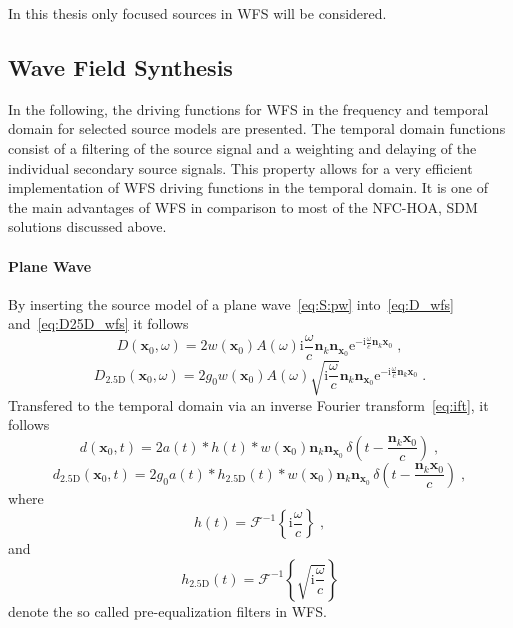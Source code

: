 \documentclass[a4paper]{book}
\newcommand{\reproduce}[1]{%
    \href{#1}{\color{link}\large\Pointinghand}%
}%
\newcommand{\ft}{\footnotesize}                                   %
\newcommand{\I}{\mathrm{i}}                          %
\newcommand{\E}{\mathrm{e}}                          %
\renewcommand{\vec}[1]{\mathbf{#1}}                  %
\newcommand{\x}{\vec{x}}                             %
\newcommand{\xref}{\x_\text{ref}}                    %
\newcommand{\n}{\vec{n}}                             %
\newcommand{\omegac}{\frac{\omega}{c}}               %
\newcommand{\deltafunc}[1]{\,\delta\!\left(#1\right)}%
\newcommand{\IFT}[1]{%
    \mathcal{F}^{-1}\left\{#1\right\}}%
\newcommand{\qc}{\;,}                                             %
\newcommand{\qp}{\;.}                                             %
\def \twohalfD {{2.5\text{D}}\xspace}                             %
\newcommand\eqlabel[2][]{%
  \label{eq:#2}%
}
\begin{document}
In this thesis only focused sources in WFS will be considered.


\subsection{Wave Field Synthesis}
\label{sec:driving_functions_wfs}

In the following, the driving functions for WFS in the frequency and
temporal domain
for selected source models are presented. The temporal domain
functions consist of a filtering of the source signal and a weighting and
delaying of the individual secondary source signals. This property allows for a very efficient
implementation of WFS driving functions in the temporal domain.
It is one of the main advantages of WFS in comparison
to most of the NFC-HOA, SDM solutions discussed above.

\paragraph{Plane Wave}
%
By inserting the source model of a plane wave~\eqref{eq:S:pw}
into~\eqref{eq:D_wfs} and~\eqref{eq:D25D_wfs} it follows
%
\begin{equation}
    D(\x_0,\omega) = 2 w(\x_0) A(\omega) \I\omegac \n_k\n_{\x_0}
    \E^{-\I\omegac\n_k\x_0} \qc
    \eqlabel{D:wfs:pw}
\end{equation}
%
\begin{equation}
    D_\twohalfD(\x_0,\omega) = 2g_0 w(\x_0) A(\omega) \sqrt{\I\omegac} \n_k\n_{\x_0} 
    \E^{-\I\omegac\n_k\x_0} \qp
    \eqlabel{D:wfs:pw:2.5D}
\end{equation}
%
%    
%
Transfered to the temporal domain via an inverse Fourier
transform~\eqref{eq:ift}, it follows
%
\begin{equation}
    d(\x_0,t) = 2 a(t) * h(t) * w(\x_0) \n_k \n_{\x_0} \deltafunc{t -
    \frac{\n_k\x_0}{c}} \qc
    \eqlabel{d:wfs:pw}
\end{equation}
%
\begin{equation}
    d_\twohalfD(\x_0,t) = 2g_0 a(t) * h_\twohalfD(t) * w(\x_0) \n_k \n_{\x_0}
    \deltafunc{t - \frac{\n_k\x_0}{c}} \qc
    \eqlabel{d:wfs:pw:2.5D}
\end{equation}
%
where
\begin{equation}
    h(t) = \IFT{\I\omegac} \qc
    \eqlabel{wfs:preeq}
\end{equation}
and
\begin{equation}
    h_\twohalfD(t) = \IFT{\sqrt{\I\omegac}}
    \eqlabel{wfs:preeq:2.5D}
\end{equation}
denote the so called pre-equalization filters in WFS.
\end{document}
